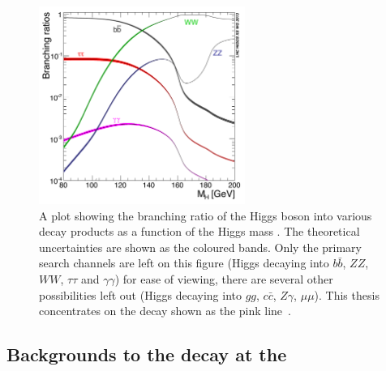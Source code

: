 \begin{figure}
  \includegraphics[width=0.6\textwidth]{theory/plots/Higgs_BR_LM}
  \caption[\acs{SM} Higgs branching fraction]{A plot showing the branching ratio of the \SM Higgs boson into various decay products as a function of the Higgs mass \mH. The theoretical uncertainties are shown as the coloured bands. Only the primary search channels are left on this figure (Higgs decaying into $b\bar{b}$, $ZZ$, $WW$, $\tau\tau$ and $\gamma\gamma$) for ease of viewing, there are several other possibilities left out (Higgs decaying into $gg$, $c\bar{c}$, $Z\gamma$, $\mu\mu$). This thesis concentrates on the \Hgg decay shown as the pink line~\cite{LHCHiggsCrossSectionWorkingGroup3}.}
  \label{fig:higgs_br}
\end{figure}

\subsection{Backgrounds to the \Hgg decay at the \LHC}

